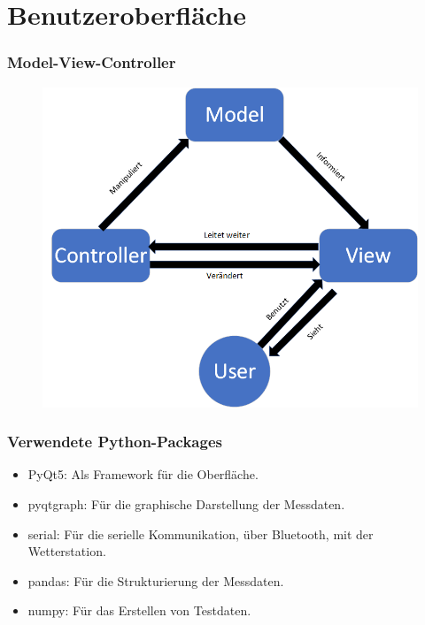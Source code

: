\documentclass{beamer}
\begin{document}
\section{Benutzeroberfläche}
\begin{frame}
  \frametitle{Model-View-Controller}
  \begin{figure}[H]
    \centering \includegraphics[width=.7\textwidth]{./img/MVC.png}
  \end{figure}
\end{frame}

\begin{frame}
  \frametitle{Verwendete Python-Packages}
  \begin{itemize}
  \item PyQt5: Als Framework für die Oberfläche.
  \item pyqtgraph: Für die graphische Darstellung der Messdaten.
  \item serial: Für die serielle Kommunikation, über Bluetooth, mit
    der Wetterstation.
  \item pandas: Für die Strukturierung der Messdaten.
  \item numpy: Für das Erstellen von Testdaten.
  \end{itemize}

\end{frame}
\end{document}
